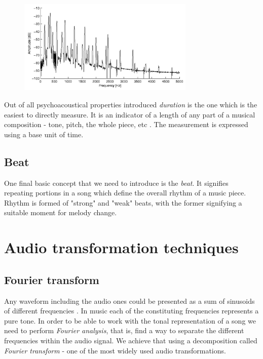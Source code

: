 \begin{figure}[H]
    \centering
    \includegraphics[width=0.75\textwidth]{BackgroundTheory/spectral_envelope}
    \label{fig:spectral-envelope}
\end{figure}

Out of all psychoacoustical properties introduced \textit{duration} is the one
which is the easiest to directly measure. It is an indicator of a length of any
part of a musical composition - tone, pitch, the whole piece, etc
\cite{benward2014music}. The measurement is expressed using a base unit of time.

\subsection{Beat}
\label{subsec:beat}
One final basic concept that we need to introduce is the \textit{beat}. It
signifies repeating portions in a song which define the overall rhythm of a
music piece. Rhythm is formed of "strong" and "weak" beats, with the former
signifying a suitable moment for melody change.

\section{Audio transformation techniques}
\label{sec:audiotransform}

\subsection{Fourier transform}
\label{subsec:fourier}
Any waveform including the audio ones could be presented as a sum of sinusoids
of different frequencies \cite{fouriertransform}. In music each of the
constituting frequencies represents a pure tone. In order to be able to work
with the tonal representation of a song we need to perform \textit{Fourier
analysis}, that is, find a way to separate the different frequencies within the
audio signal. We achieve that using a decomposition called \textit{Fourier
transform} - one of the most widely used audio transformations.

